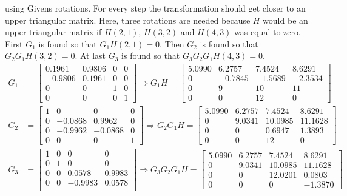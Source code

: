 using Givens rotations. For every step the transformation should get closer to an upper triangular matrix. Here, three rotations are needed because $H$ would be an upper triangular matrix if $H(2,1)$, $H(3,2)$ and $H(4,3)$ was equal to zero. First $G_1$ is found so that $G_1 H(2,1) = 0$. Then $G_2$ is found so that $G_2 G_1 H(3,2) = 0$. At last $G_3$ is found so that $G_3 G_2 G_1 H(4,3) = 0$.
\begin{align*}
G_{1} &= 
 \left[
 \begin{matrix}
    0.1961  &  0.9806 & 0  &  0 \\
   -0.9806  &  0.1961 & 0  &  0 \\
    0       &  0      & 1  &  0 \\
    0       &  0      & 0  &  1
 \end{matrix}
 \right]
 \Rightarrow G_{1}H = 
  \left[
 \begin{matrix}
    5.0990  &  6.2757 & 7.4524  &  8.6291 \\
    0  &  -0.7845 & -1.5689  &  -2.3534 \\
    0       &  9      & 10  &  11 \\
    0       &  0      & 12  &  0
 \end{matrix}
 \right] \\
G_{2} &=
 \left[
 \begin{matrix}
    1 &  0      &   0      &  0 \\
    0 & -0.0868 &   0.9962 &  0 \\
    0 & -0.9962 &  -0.0868 &  0 \\
    0 &  0      &   0      &  1
 \end{matrix}
 \right]
  \Rightarrow G_2 G_1 H = 
  \left[
 \begin{matrix}
    5.0990  &  6.2757 & 7.4524   &  8.6291 \\
    0       &  9.0341 & 10.0985  &  11.1628 \\
    0       &  0      & 0.6947   &  1.3893 \\
    0       &  0      & 12       &  0
 \end{matrix}
 \right] \\
G_{3} &=
 \left[
 \begin{matrix}
    1  &  0  &  0      &  0      \\
    0  &  1  &  0      &  0      \\
    0  &  0  &  0.0578 &  0.9983 \\
    0  &  0  & -0.9983 &  0.0578 \\
 \end{matrix}
 \right]
  \Rightarrow G_3 G_2 G_1 H = 
  \left[
 \begin{matrix}
    5.0990  &  6.2757 & 7.4524   &  8.6291 \\
    0       &  9.0341 & 10.0985  &  11.1628 \\
    0       &  0      & 12.0201  &   0.0803 \\
    0       &  0      & 0       &  -1.3870
 \end{matrix}
 \right] 
\end{align*}

